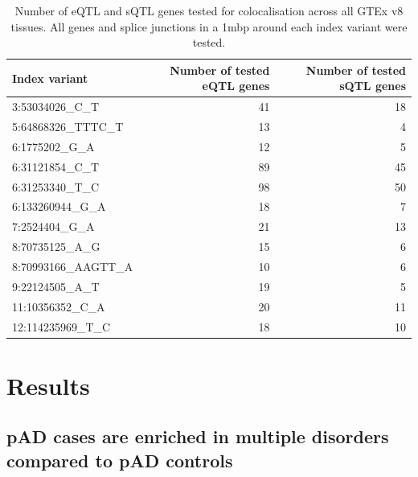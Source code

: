 \begin{table}[H]

  \caption[Number of genes with a QTL signal that was tested for colocalisation with a pAD-associated locus]{Number of eQTL and sQTL genes tested for colocalisation across all GTEx v8 tissues. All genes and splice junctions in a 1mbp around each index variant were tested.}
  \centering
  \begin{tabular}[t]{|l|r|r|}
  \hline
  Index variant & Number of tested eQTL genes & Number of tested sQTL genes\\
  \hline
  3:53034026\_C\_T & 41 & 18\\
  \hline
  5:64868326\_TTTC\_T & 13 & 4\\
  \hline
  6:1775202\_G\_A & 12 & 5\\
  \hline
  6:31121854\_C\_T & 89 & 45\\
  \hline
  6:31253340\_T\_C & 98 & 50\\
  \hline
  6:133260944\_G\_A & 18 & 7\\
  \hline
  7:2524404\_G\_A & 21 & 13\\
  \hline
  8:70735125\_A\_G & 15 & 6\\
  \hline
  8:70993166\_AAGTT\_A & 10 & 6\\
  \hline
  9:22124505\_A\_T & 19 & 5\\
  \hline
  11:10356352\_C\_A & 20 & 11\\
  \hline
  12:114235969\_T\_C & 18 & 10\\
  \hline
  \end{tabular}
  \end{table}



\section{Results}



  \subsection{pAD cases are enriched in multiple disorders compared to pAD controls}\label{section:pheno_enrich}


